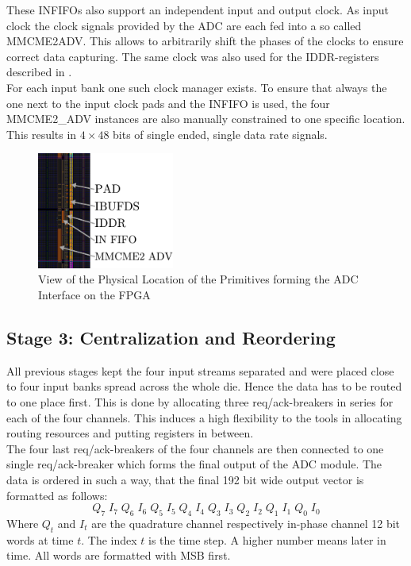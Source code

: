 These \glspl{INFIFO} also support an independent input and output clock.
As input clock the clock signals provided by the \gls{ADC} are each fed
into a so called \gls{MMCME2ADV}.
This allows to arbitrarily shift the phases of the clocks to ensure
correct data capturing. The same clock was also used for the
\gls{IDDR}-registers described in . \\

For each input bank one such clock manager exists. To ensure that
always the one next to the input clock pads and the \gls{INFIFO} is
used, the four MMCME2\_ADV instances are also manually constrained to
one specific location. \\

This results in $4 \times 48$ bits of single ended, single data rate signals. \\

\begin{figure}
  \centering
  \includegraphics[width=0.4\textwidth]{figures/adc_input_bank}
  \caption{View of the Physical Location of the Primitives forming the
    \gls{ADC} Interface on the \gls{FPGA}}
  \label{fig:adc_input_bank}
\end{figure}

\subsection{Stage 3: Centralization and Reordering}
\label{sec:fpga_adc_s3}
All previous stages kept the four input streams separated
and were placed close to four input banks spread across the whole die.
Hence the data has to be routed to one place first.
This is done by allocating three \gls{req}/\gls{ack}-breakers
in series for each of the four channels.
This induces a high flexibility to the tools in allocating routing
resources and putting registers in between. \\

The four last \gls{req}/\gls{ack}-breakers of the four channels are then connected
to one single \gls{req}/\gls{ack}-breaker which forms the final output of the
\gls{ADC} module. The data is ordered in such a way, that the final 192 bit
wide output vector is formatted as follows:
\[Q_7\;I_7\;Q_6\;I_6\;Q_5\;I_5\;Q_4\;I_4\;Q_3\;I_3\;Q_2\;I_2\;Q_1\;I_1\;Q_0\;I_0\]
Where $Q_t$ and $I_t$ are the quadrature channel respectively in-phase channel
12 bit words at time $t$.
The index $t$ is the time step. A higher number means later in time.
All words are formatted with \gls{MSB} first. \\

